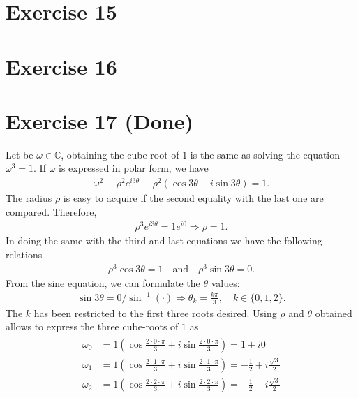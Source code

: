 \documentclass[letterpaper,11pt,twoside]{article}
\begin{document}
\section{Exercise 15}

\section{Exercise 16}

\section{Exercise 17 (Done)}
Let be $\omega\in\mathbb{C}$, obtaining the cube-root of $1$ is the same as solving the equation $\omega^3=1$.
If $\omega$ is expressed in polar form, we have
\begin{align*}
  \omega^2\equiv\rho^2 e^{i3\theta}\equiv\rho^2(\cos3\theta+i\sin3\theta)=1.
\end{align*}
The radius $\rho$ is easy to acquire if the second equality with the last one are compared. Therefore,
\begin{align*}
  \rho^3e^{i3\theta}=1e^{i0}\Longrightarrow\rho=1.
\end{align*}
In doing the same with the third and last equations we have the following relations
\begin{align*}
  \rho^3\cos3\theta=1\quad\text{and}\quad\rho^3\sin3\theta=0.
\end{align*}
From the sine equation, we can formulate the $\theta$ values:
\begin{align*}
  \sin3\theta=0/\sin^{-1}(\cdot)\Longrightarrow \theta_k=\frac{k\pi}{3},\quad k\in\{0,1,2\}.
\end{align*}
The $k$ has been restricted to the first three roots desired.
Using $\rho$ and $\theta$ obtained allows to express the three cube-roots of $1$ as
\begin{align}
  \begin{array}{rl}
    \omega_0&=1\left(\cos\frac{2\cdot0\cdot\pi}{3}+i\sin\frac{2\cdot0\cdot\pi}{3}\right)=1+i0\\
    \omega_1&=1\left(\cos\frac{2\cdot1\cdot\pi}{3}+i\sin\frac{2\cdot1\cdot\pi}{3}\right)=-\frac{1}{2}+i\frac{\sqrt{3}}{2}\\
    \omega_2&=1\left(\cos\frac{2\cdot2\cdot\pi}{3}+i\sin\frac{2\cdot2\cdot\pi}{3}\right)=-\frac{1}{2}-i\frac{\sqrt{3}}{2}\\
  \end{array}
\end{align}
\end{document}
